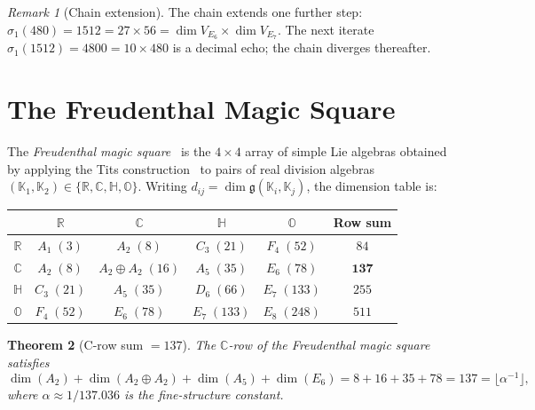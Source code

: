 \documentclass[11pt]{amsart}
\theoremstyle{plain}
\newtheorem{theorem}{Theorem}[section]
\theoremstyle{definition}
\theoremstyle{remark}
\newtheorem{remark}[theorem]{Remark}
\newcommand{\fg}{\mathfrak{g}}
\begin{document}
\begin{remark}[Chain extension]\label{rem:chain-extension}
The chain extends one further step: $\sigma_1(480) = 1512 = 27 \times 56
= \dim V_{E_6} \times \dim V_{E_7}$.  The next iterate
$\sigma_1(1512) = 4800 = 10 \times 480$ is a decimal echo; the chain
diverges thereafter.
\end{remark}

\section{The Freudenthal Magic Square}\label{sec:freudenthal}

The \emph{Freudenthal magic square}~\cite{Freudenthal1964} is the $4\times 4$
array of simple Lie algebras obtained by applying the Tits
construction~\cite{Tits1966} to pairs of real division algebras
$(\mathbb{K}_1, \mathbb{K}_2) \in \{\mathbb{R}, \mathbb{C},
\mathbb{H}, \mathbb{O}\}$.  Writing $d_{ij} = \dim\fg(\mathbb{K}_i,
\mathbb{K}_j)$, the dimension table is:

\bigskip
\begin{center}
\renewcommand{\arraystretch}{1.2}
\begin{tabular}{c|cccc|c}
\toprule
 & $\mathbb{R}$ & $\mathbb{C}$ & $\mathbb{H}$ & $\mathbb{O}$ & Row sum \\
\midrule
$\mathbb{R}$ & $A_1\;(3)$  & $A_2\;(8)$       & $C_3\;(21)$  & $F_4\;(52)$  & $84$ \\
$\mathbb{C}$ & $A_2\;(8)$  & $A_2\oplus A_2\;(16)$ & $A_5\;(35)$  & $E_6\;(78)$  & $\mathbf{137}$ \\
$\mathbb{H}$ & $C_3\;(21)$ & $A_5\;(35)$      & $D_6\;(66)$  & $E_7\;(133)$ & $255$ \\
$\mathbb{O}$ & $F_4\;(52)$ & $E_6\;(78)$      & $E_7\;(133)$ & $E_8\;(248)$ & $511$ \\
\bottomrule
\end{tabular}
\end{center}
\bigskip

\begin{theorem}[C-row sum $= 137$]\label{thm:C-row-137}
The $\mathbb{C}$-row of the Freudenthal magic square satisfies
\[
\dim(A_2) + \dim(A_2 \oplus A_2) + \dim(A_5) + \dim(E_6)
  = 8 + 16 + 35 + 78 = 137 = \lfloor\alpha^{-1}\rfloor,
\]
where $\alpha \approx 1/137.036$ is the fine-structure constant.
\end{theorem}
\end{document}

